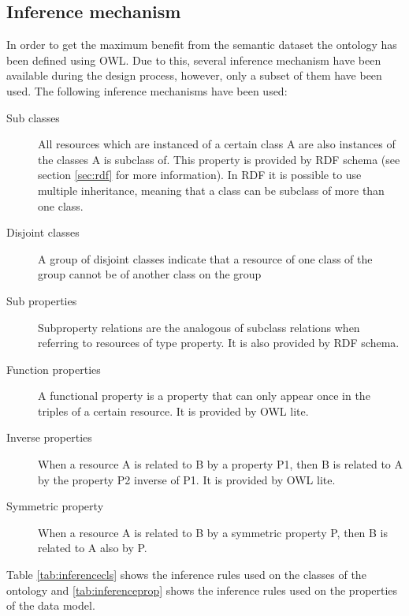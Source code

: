 \subsection*{Inference mechanism}

In order to get the maximum benefit from the semantic dataset the ontology has been defined using OWL. Due to this, several inference mechanism have been available during the design process, however, only a subset of them have been used. The following inference mechanisms have been used:

\begin{description}
\item[Sub classes] All resources which are instanced of a certain class A are also instances of the classes A is subclass of. This property is provided by RDF schema (see section \ref{sec:rdf} for more information). In RDF it is possible to use multiple inheritance, meaning that a class can be subclass of more than one class.
\item[Disjoint classes] A group of disjoint classes indicate that a resource of one class of the group cannot be of another class on the group
\item[Sub properties] Subproperty relations are the analogous of subclass relations when referring to resources of type property. It is also provided by RDF schema.
\item[Function properties] A functional property is a property that can only appear once in the triples of a certain resource. It is provided by OWL lite.
\item[Inverse properties] When a resource A is related to B by a property P1, then B is related to A by the property P2 inverse of P1. It is provided by OWL lite.
\item[Symmetric property] When a resource A is related to B by a symmetric property P, then B is related to A also by P.

\end{description}

Table \ref{tab:inferencecls} shows the inference rules used on the classes of the ontology and \ref{tab:inferenceprop} shows the inference rules used on the properties of the data model.

